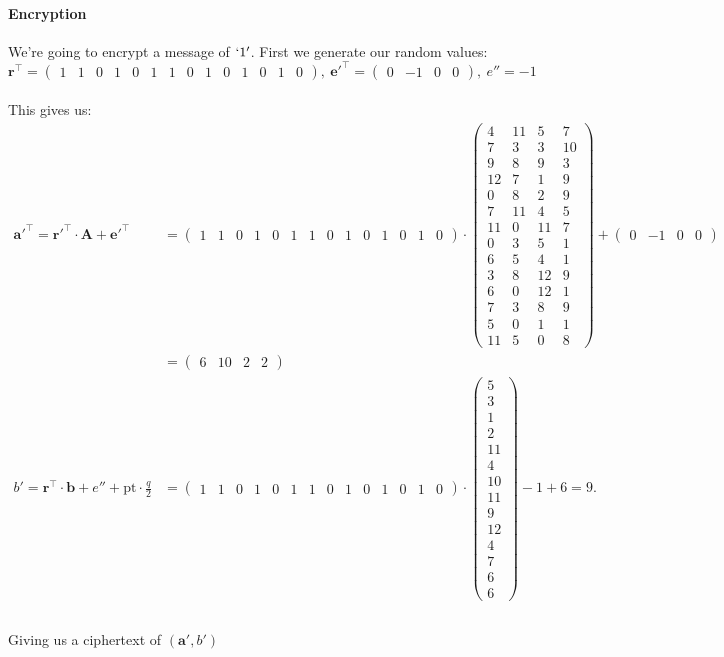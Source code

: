 \documentclass[a4paper, 11pt, openany]{book}
\numberwithin{equation}{section}
\theoremstyle{plain}
\theoremstyle{definition}
\begin{document}
\paragraph{Encryption}
We're going to encrypt a message of $`1'$. First we generate our random values:
$$ \textbf{r}^{\top} = \begin{pmatrix}
	1&1&0&1&0&1&1&0&1&0&1&0&1&0
\end{pmatrix},~
\textbf{e}'^{\top}=\begin{pmatrix}
	0&-1&0&0
\end{pmatrix},~
e'' = -1
$$
\\
This gives us:
\begin{align*}
\textbf{a}'^{\top} = \textbf{r}'^{\top}\cdot \textbf{A}+\textbf{e}'^{\top}  &= 
\begin{pmatrix}
	1&1&0&1&0&1&1&0&1&0&1&0&1&0
\end{pmatrix} \cdot
\begin{pmatrix}  
	4& 11&  5&  7\\
	7&  3&  3& 10\\
	9&  8&  9&  3\\
	12&  7&  1&  9\\
	0&  8&  2&  9\\
	7& 11&  4&  5\\
	11&  0& 11&  7\\
	0&  3&  5&  1\\
	6&  5&  4&  1\\
	3&  8& 12&  9\\
	6&  0& 12&  1\\
	7&  3&  8&  9\\
	5&  0&  1&  1\\
	11&  5&  0&  8
\end{pmatrix} + \begin{pmatrix}
0&-1&0&0
\end{pmatrix}\\
&= 
\begin{pmatrix}
6&10&2&2
\end{pmatrix}\\
b'  = \textbf{r}^{\top}\cdot\textbf{b} + e'' + \text{pt}\cdot\frac{q}{2} &=  \begin{pmatrix}
	1&1&0&1&0&1&1&0&1&0&1&0&1&0
\end{pmatrix}\cdot
\begin{pmatrix}
	5\\3\\1\\2\\11\\4\\10\\11\\9\\12\\4\\7\\6\\6
\end{pmatrix} -1 + 6 = 9.
\\
\end{align*}
\\
Giving us a ciphertext of $(\textbf{a}',b')$
\end{document}
